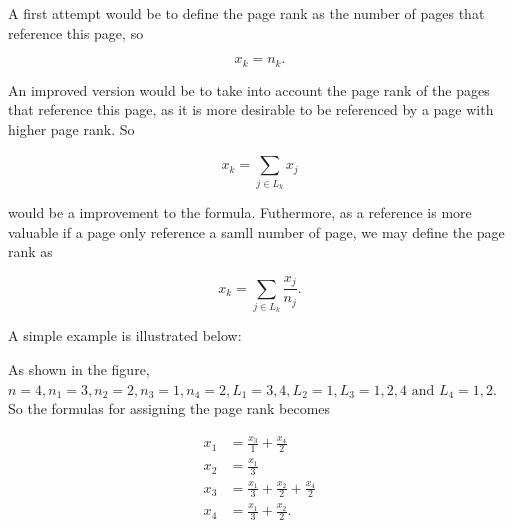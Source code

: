 \documentclass[a4paper,12pt]{report}
\begin{document}
{A first attempt would be to define the page rank as the number of pages that reference this page, so 

\begin{equation}
    x_{k} = n_{k}.
\end{equation}

An improved version would be to take into account the page rank of the pages that reference this page, as it is more desirable to be referenced by a page with higher page rank. So 

\begin{equation}
    x_{k} = \sum_{j \in L_{k} }^{} x_{j}   
\end{equation}

would be a improvement to the formula. Futhermore, as a reference is more valuable if a page only reference a samll number of page, we may define the page rank as 

\begin{equation}
    x_{k} = \sum_{j \in L_{k} }^{} \frac{x_{j} }{n_{j} }.   
\end{equation}

A simple example is illustrated below:

\begin{center}
\end{center}

As shown in the figure, \(n=4, n_{1}=3, n_{2} = 2, n_3 = 1, n_4 = 2, L_{1} = {3,4}, L_{2} = {1}, L_3 = {1,2,4} \text { and } L_4 = {1,2}\). So the formulas for assigning the page rank becomes

\begin{equation}
    \begin{aligned}
        x_{1} &= \frac{x_3}{1} + \frac{x_4}{2} \\
        x_{2} &= \frac{x_{1}}{3} \\
        x_3 &= \frac{x_{1}}{3} + \frac{x_{2}}{2} + \frac{x_4}{2} \\
        x_4 &= \frac{x_{1}}{3} + \frac{x_{2}}{2}.        
    \end{aligned}
\end{equation}

}
\end{document}
